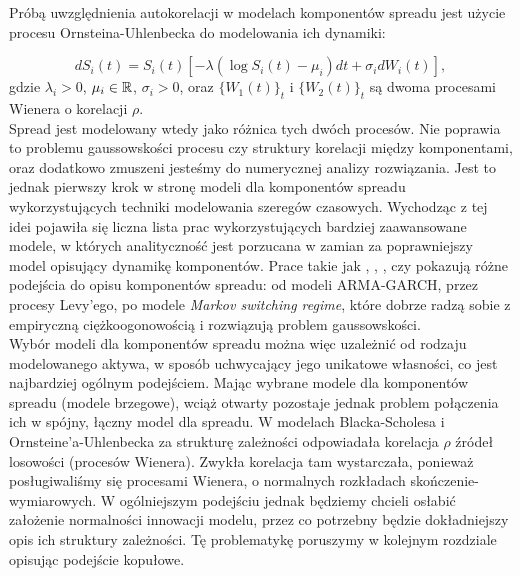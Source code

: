 Próbą uwzględnienia autokorelacji w modelach komponentów spreadu jest użycie procesu Ornsteina-Uhlenbecka do modelowania ich dynamiki:

$$ dS_i(t) =S_i(t)[-\lambda (\log S_i(t) - \mu_i)dt + \sigma_i dW_i(t)],$$
gdzie $\lambda_i>0$,  $\mu_i \in \mathbb{R}$, $\sigma_i >0$, oraz $\{W_1(t)\}_t$ i $\{W_2(t)\}_t$ są dwoma procesami Wienera o korelacji $\rho$.\\

Spread jest modelowany wtedy jako różnica tych dwóch procesów. Nie poprawia to problemu gaussowskości procesu czy struktury korelacji między komponentami, oraz dodatkowo zmuszeni jesteśmy do numerycznej analizy rozwiązania. Jest to jednak pierwszy krok w stronę modeli dla komponentów spreadu wykorzystujących techniki modelowania szeregów czasowych. Wychodząc z tej idei pojawiła się liczna lista prac wykorzystujących bardziej zaawansowane modele, w których analityczność jest porzucana w zamian za poprawniejszy model opisujący dynamikę komponentów. Prace takie jak \cite{Herath_Copula_Crack_Spread}, \cite{Boubaker_Markov_Copula}, \cite{Espen_Crack_Spread_Copula}, czy \cite{Bernard_Pricing_Multivariate_Options_with_copulae} pokazują różne podejścia do opisu komponentów spreadu: od modeli ARMA-GARCH, przez procesy Levy'ego, po modele \emph{Markov switching regime}, które dobrze radzą sobie z empiryczną ciężkoogonowością i rozwiązują problem gaussowskości.\\

Wybór modeli dla komponentów spreadu można więc uzależnić od rodzaju modelowanego aktywa, w sposób uchwycający jego unikatowe własności, co jest najbardziej ogólnym podejściem. Mając wybrane modele dla komponentów spreadu (modele brzegowe), wciąż otwarty pozostaje jednak problem połączenia ich w spójny, łączny model dla spreadu. W modelach Blacka-Scholesa i Ornsteine'a-Uhlenbecka za strukturę zależności odpowiadała korelacja $\rho$ źródeł losowości (procesów Wienera). Zwykła korelacja tam wystarczała, ponieważ posługiwaliśmy się procesami Wienera, o normalnych rozkładach skończenie-wymiarowych. W ogólniejszym podejściu jednak będziemy chcieli osłabić założenie normalności innowacji modelu, przez co potrzebny będzie dokładniejszy opis ich struktury zależności. Tę problematykę poruszymy w kolejnym rozdziale opisując podejście kopułowe.